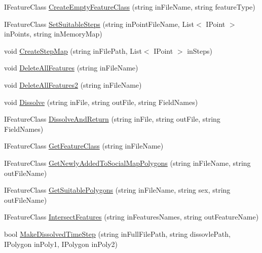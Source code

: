 \begin{DoxyCompactItemize}
I\-Feature\-Class \hyperlink{class_p_a_z___dispersal_1_1_data_manipulator_a0661b8417bd660abf56127adf9207e26}{Create\-Empty\-Feature\-Class} (string in\-File\-Name, string feature\-Type)
\item 
I\-Feature\-Class \hyperlink{class_p_a_z___dispersal_1_1_data_manipulator_af698a712c5383c9170d927bf7bd7b48b}{Set\-Suitable\-Steps} (string in\-Point\-File\-Name, List$<$ I\-Point $>$ in\-Points, string in\-Memory\-Map)
\item 
void \hyperlink{class_p_a_z___dispersal_1_1_data_manipulator_a33851d7fdbf5c2979c27d1a1505e9d10}{Create\-Step\-Map} (string in\-File\-Path, List$<$ I\-Point $>$ in\-Steps)
\item 
void \hyperlink{class_p_a_z___dispersal_1_1_data_manipulator_a612981e27bcb4a7a25a77f1205a5d856}{Delete\-All\-Features} (string in\-File\-Name)
\item 
void \hyperlink{class_p_a_z___dispersal_1_1_data_manipulator_a5fee4fd29122be21871dbe0c64d2d33d}{Delete\-All\-Features2} (string in\-File\-Name)
\item 
void \hyperlink{class_p_a_z___dispersal_1_1_data_manipulator_a16103ec781853f2838a79ad0264d0057}{Dissolve} (string in\-File, string out\-File, string Field\-Names)
\item 
I\-Feature\-Class \hyperlink{class_p_a_z___dispersal_1_1_data_manipulator_a2285bd9d66720b474d603d715c60f5c7}{Dissolve\-And\-Return} (string in\-File, string out\-File, string Field\-Names)
\item 
I\-Feature\-Class \hyperlink{class_p_a_z___dispersal_1_1_data_manipulator_a05d4371b2fb70830fc4c96b8e3c69e73}{Get\-Feature\-Class} (string in\-File\-Name)
\item 
I\-Feature\-Class \hyperlink{class_p_a_z___dispersal_1_1_data_manipulator_aa2e73bf2e93c484e7f210f20eb6d2520}{Get\-Newly\-Added\-To\-Social\-Map\-Polygons} (string in\-File\-Name, string out\-File\-Name)
\item 
I\-Feature\-Class \hyperlink{class_p_a_z___dispersal_1_1_data_manipulator_a52d2df7bd13ab85fa1667795de8b10e3}{Get\-Suitable\-Polygons} (string in\-File\-Name, string sex, string out\-File\-Name)
\item 
I\-Feature\-Class \hyperlink{class_p_a_z___dispersal_1_1_data_manipulator_a23f14111813abff28b1bbf533b5f9e23}{Intersect\-Features} (string in\-Features\-Names, string out\-Feature\-Name)
\item 
bool \hyperlink{class_p_a_z___dispersal_1_1_data_manipulator_a4757c2cec14b1ed082287c58414fb779}{Make\-Dissolved\-Time\-Step} (string in\-Full\-File\-Path, string dissovle\-Path, I\-Polygon in\-Poly1, I\-Polygon in\-Poly2)

\end{DoxyCompactItemize}

